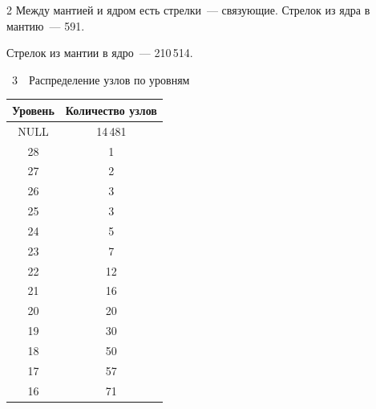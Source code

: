 \begin{multicols}{2}
   Между мантией и ядром есть стрелки~--- связу\-ющие. Стрелок из ядра в мантию~--- 591. 

Стрелок из мантии в ядро~--- 210\,514.

   

     \begin{center}  %


\parbox{120pt}{{\tablename~3}\ \ \small{Распределение узлов по уровням}}



\vspace*{6pt}



{\small   

\tabcolsep=3.5pt

   \begin{tabular}{|c|c|}

   \hline

   Уровень & Количество узлов\\

   \hline

   NULL & 14\,481\hphantom{99}\\

   28&\hphantom{99}1\\

   27 &\hphantom{99}2\\

   26&\hphantom{99}3\\

   25&\hphantom{99}3\\

   24&\hphantom{99}5\\

   23&\hphantom{99}7\\

   22&\hphantom{9}12\\

   21&\hphantom{9}16\\

   20&\hphantom{9}20\\

   19&\hphantom{9}30\\

   18&\hphantom{9}50\\

   17&\hphantom{9}57\\

   16&\hphantom{9}71\\


\end{tabular}}
\end{center}
\end{multicols}

